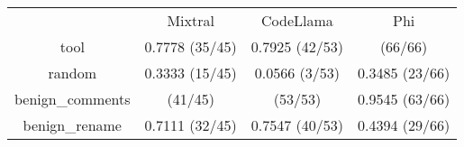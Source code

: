 \begin{table}[h!]
\centering
\begin{tabular}{|c|c|c|c|}
\hline
 & Mixtral & CodeLlama & Phi \\

tool & 0.7778 (35/45) & 0.7925 (42/53) & \cellcolor{blue!10}{1.0000} (66/66) \\

random & 0.3333 (15/45) & 0.0566 (3/53) & 0.3485 (23/66) \\

benign_comments & \cellcolor{blue!10}{0.9111} (41/45) & \cellcolor{blue!10}{1.0000} (53/53) & 0.9545 (63/66) \\

benign_rename & 0.7111 (32/45) & 0.7547 (40/53) & 0.4394 (29/66) \\

\end{tabular}
\end{table}
